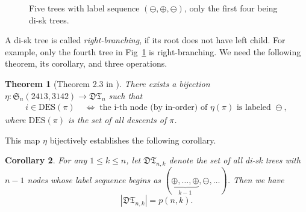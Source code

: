 \documentclass[11pt,reqno]{amsart}
\numberwithin{equation}{section}
\theoremstyle{plain}
\newtheorem{theorem}{Theorem}[section]
\newtheorem{corollary}[theorem]{Corollary}
\theoremstyle{definition}
\def\DT{\mathfrak{DT}}
\def\DES{\mathrm{DES}}
\begin{document}
\begin{figure}
\caption{Five trees with label sequence $(\ominus,\oplus,\ominus)$, only the first four being di-sk trees.}\label{label seq}
\end{figure}

A di-sk tree is called \emph{right-branching}, if its root does not have left child. For example, only the fourth tree in Fig~\ref{label seq} is right-branching. We need the following theorem, its corollary, and three operations.

\begin{theorem}[Theorem 2.3 in \cite{FLZ}]\label{FLZ-bij}
There exists a bijection $\eta: \mathfrak{S}_n(2413,3142)\rightarrow \mathfrak{DT}_n$ such that
\begin{align*}
i\in\DES(\pi)\; &\Leftrightarrow \; \text{the i-th node (by in-order) of $\eta(\pi)$ is labeled $\ominus$},
\end{align*}
where $\DES(\pi)$ is the set of all descents of $\pi$.
\end{theorem}
This map $\eta$ bijectively establishes the following corollary.
\begin{corollary}\label{dt=sp/iar}
For any $1\le k\le n$, let $\DT_{n,k}$ denote the set of all di-sk trees with $n-1$ nodes whose label sequence begins as $(\underbrace{\oplus,\ldots,\oplus}_{k-1},\ominus,\ldots)$. Then we have $$|\DT_{n,k}|=p(n,k).$$
\end{corollary}
\end{document}
